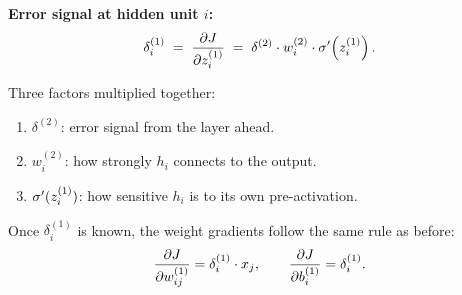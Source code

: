 \documentclass[12pt, a4paper]{article}
\begin{document}
\begin{patternbox}
  \textbf{Error signal at hidden unit $i$:}
  \[
    \delta^{(1)}_i
    \;=\; \dfrac{\partial J}{\partial z^{(1)}_i}
    \;=\; \delta^{(2)}
    \cdot w^{(2)}_i
    \cdot \sigma'\!\left(z^{(1)}_i\right).
  \]

  Three factors multiplied together:
  \begin{enumerate}[nosep]
    \item $\delta^{(2)}$: error signal from the layer ahead.
    \item $w^{(2)}_i$: how strongly $h_i$ connects to the output.
    \item $\sigma'(z^{(1)}_i)$: how sensitive $h_i$ is to its own
          pre-activation.
  \end{enumerate}

  Once $\delta^{(1)}_i$ is known, the weight gradients follow the same rule
  as before:
  \[
    \dfrac{\partial J}{\partial w^{(1)}_{ij}} = \delta^{(1)}_i \cdot x_j, \qquad
    \dfrac{\partial J}{\partial b^{(1)}_i}    = \delta^{(1)}_i.
  \]
\end{patternbox}

\vspace{0.8em}
\end{document}
